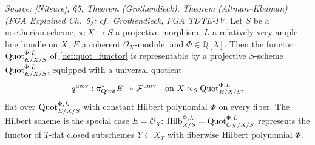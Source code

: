 \begin{theorem}
  \textit{Source: [Nitsure], \S 5, Theorem (Grothendieck), Theorem
  (Altman--Kleiman) (FGA Explained Ch.~5); cf.\ Grothendieck, FGA TDTE-IV.}
  Let \(S\) be a noetherian scheme, \(\pi : X \to S\) a projective morphism,
  \(L\) a relatively very ample line bundle on \(X\), \(E\) a coherent
  \(\mathcal{O}_X\)-module, and \(\Phi \in \mathbb{Q}[\lambda]\). Then the
  functor \(\operatorname{Quot}^{\Phi,L}_{E/X/S}\) of \cref{def:quot_functor} is
  representable by a projective \(S\)-scheme \(\operatorname{Quot}^{\Phi,L}_{E/X/S}\),
  equipped with a universal quotient
  \[
    q^{\mathrm{univ}} :
    \pi^*_{\operatorname{Quot}} E \twoheadrightarrow \mathcal{F}^{\mathrm{univ}}
    \quad \text{on } X \times_S \operatorname{Quot}^{\Phi,L}_{E/X/S},
  \]
  flat over \(\operatorname{Quot}^{\Phi,L}_{E/X/S}\) with constant Hilbert polynomial
  \(\Phi\) on every fiber. The Hilbert scheme is the special case
  \(E = \mathcal{O}_X\): \(\operatorname{Hilb}^{\Phi,L}_{X/S} = \operatorname{Quot}^{\Phi,L}_{\mathcal{O}_X/X/S}\)
  represents the functor of \(T\)-flat closed subschemes
  \(Y \subset X_T\) with fiberwise Hilbert polynomial \(\Phi\).
\end{theorem}

